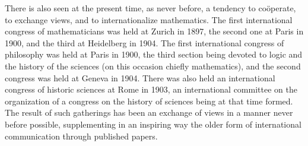 \documentclass[oneside]{book}
\begin{document}
There is also seen at the present time, as never before, a
tendency to co\"operate, to exchange views, and to internationalize
mathematics. The first international congress of mathematicians
was held at Zurich in 1897, the second one at Paris in 1900, and
the third at Heidelberg in 1904. The first international congress
of philosophy was held at Paris in 1900, the third section
being devoted to logic and the history of the sciences (on this
occasion chiefly mathematics), and the second congress was
held at Geneva in 1904. There was also held an international
congress of historic sciences at Rome in 1903, an international
committee on the organization of a congress on the history of
sciences being at that time formed. The result of such gatherings
has been an exchange of views in a manner never before
possible, supplementing in an inspiring way the older form of
international communication through published papers.
\end{document}
